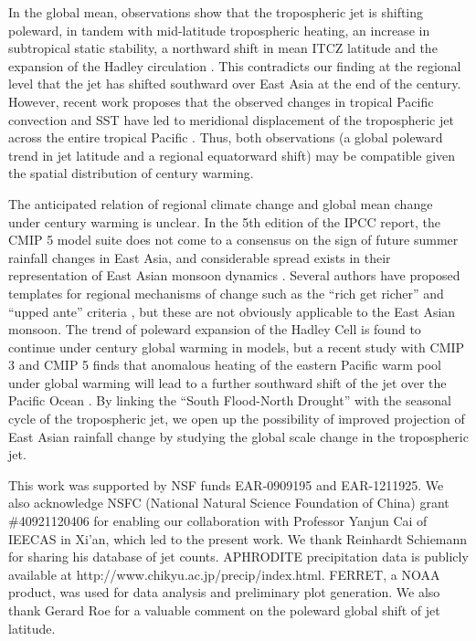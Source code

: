 \documentclass[draft,grl]{AGUTeX}
\begin{document}
\begin{article}
	 In the global mean, observations show that the tropospheric jet is shifting poleward, in tandem with mid-latitude tropospheric heating, an increase in subtropical static stability, a northward shift in mean ITCZ latitude and the expansion of the Hadley circulation \citep{Fu2006,Archer2008}. This contradicts our finding at the regional level that the jet has shifted southward over East Asia at the end of the  century. However, recent work proposes that the observed changes in tropical Pacific convection and SST have led to meridional displacement of the tropospheric jet across the entire tropical Pacific \citep{Park2014a}. Thus, both observations (a global poleward trend in jet latitude and a regional equatorward shift) may be compatible given the spatial distribution of  century warming.

	The anticipated relation of regional climate change and global mean change under  century warming is unclear. In the 5th edition of the IPCC report, the CMIP 5 model suite does not come to a consensus on the sign of future summer rainfall changes in East Asia\citep{Christensen2011}, and considerable spread exists in their representation of East Asian monsoon dynamics \citep{Chen2014b}. Several authors have proposed templates for regional mechanisms of change such as the ``rich get richer'' and ``upped ante'' criteria \citep{Held2006,Lintner2007,Chou2009}, but these are not obviously applicable to the East Asian monsoon. The trend of poleward expansion of the Hadley Cell is found to continue under  century global warming in models\citep{Lu2007,Kang2012}, but a recent study with CMIP 3 and CMIP 5 finds that anomalous heating of the eastern Pacific warm pool under global warming will lead to a further southward shift of the jet over the Pacific Ocean \citep{Park2014}. By linking the ``South Flood-North Drought'' with the seasonal cycle of the tropospheric jet, we open up the possibility of improved projection of East Asian rainfall change by studying the global scale change in the tropospheric jet.



\begin{acknowledgments}
This work was supported by NSF funds EAR-0909195 and EAR-1211925. We also acknowledge NSFC (National Natural Science Foundation of China) grant \#40921120406 for enabling our collaboration with Professor Yanjun Cai of IEECAS in Xi'an, which led to the present work. We thank Reinhardt Schiemann for sharing his database of jet counts. APHRODITE precipitation data is publicly available at http://www.chikyu.ac.jp/precip/index.html. FERRET, a NOAA product, was used for data analysis and preliminary plot generation. We also thank Gerard Roe for a valuable comment on the poleward global shift of jet latitude.
\end{acknowledgments}




%
%
\end{article}
\end{document}
